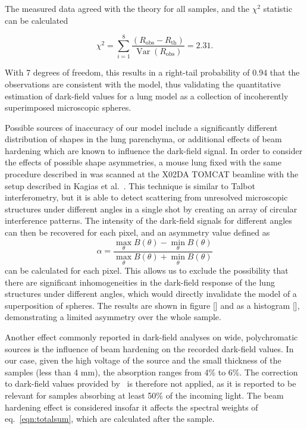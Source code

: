 
The measured data agreed with the
theory for all samples, and the $\chi^2$ statistic can be calculated

\begin{equation}
    \chi^2 = \sum_{i=1}^8 \dfrac{(R_{\text{obs}} -
    R_{\text{th}})}{\mathop{\mathrm{Var}}(R_{\text{obs}})} = 2.31.
    \label{eqn:chisq}
\end{equation}

With 7 degrees of freedom, this results in a right-tail probability of 0.94 that the 
observations are consistent with the model, thus validating the quantitative estimation of
dark-field values for a lung model as a collection of incoherently
superimposed microscopic spheres.

Possible sources of inaccuracy of our model include a significantly
different distribution of shapes in the lung parenchyma, or additional
effects of beam hardening which are known to influence the dark-field
signal. In order to consider the effects of possible shape asymmetries, a
mouse lung fixed with the same procedure described in was scanned at the
X02DA TOMCAT beamline with the setup described in Kagias et
al.~\cite{PhysRevLett.116.093902}. This technique is similar to Talbot
interferometry, but it is able to detect scattering from unresolved
microscopic structures under different angles in a single shot by
creating an array of circular interference patterns. The intensity of the
dark-field signals for different angles can then be recovered for each
pixel, and an asymmetry value defined as
\begin{equation}
    \alpha =
    \frac{\max_\theta{B(\theta)} -
    \min_\theta{B(\theta)}}{\max_\theta{B(\theta)} + \min_\theta{B(\theta)}}
    \label{eqn:asymmetry}
\end{equation}
can be calculated for each pixel. This allows us to exclude the possibility
that there are significant inhomogeneities in the dark-field response of the
lung structures under different angles, which would directly invalidate the
model of a superposition of spheres. The results are shown in figure [] and
as a histogram [], demonstrating a limited asymmetry over the whole sample.

Another effect commonly reported in dark-field analyses on wide, polychromatic
sources is the influence of beam hardening on the recorded dark-field
values. In our case, given the high voltage of the source and the small
thickness of the samples (less than 4 mm), the absorption ranges from 4\% to
6\%. The correction to dark-field values provided by~\cite{Yashiro:15} is therefore
not applied, as it is reported to be relevant for samples absorbing at least
50\% of the incoming light. The beam hardening effect is considered insofar
it affects the spectral weights of eq.~\ref{eqn:totalsum}, which are calculated
after the sample.
